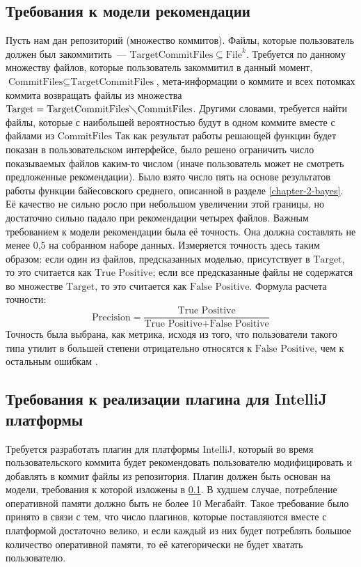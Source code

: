 \subsection{Требования к модели рекомендации}\label{ml-model-req}
Пусть нам дан репозиторий (множество коммитов). Файлы, которые пользователь должен был закоммитить~--- $\text{TargetCommitFiles} \subseteq \text{File}^k$. Требуется по данному множеству файлов, которые пользователь закоммитил в данный момент, $\text{CommitFiles} \subseteq \text{TargetCommitFiles}$, мета-информации о коммите и всех потомках коммита возвращать файлы из множества $\text{Target} = \text{TargetCommitFiles} \diagdown \text{CommitFiles}$. Другими словами, требуется найти файлы, которые с наибольшей вероятностью будут в одном коммите вместе с файлами из $\text{CommitFiles}$ Так как результат работы решающей функции будет показан в пользовательском интерфейсе, было решено ограничить число показываемых файлов каким-то числом (иначе пользователь может не смотреть предложенные рекомендации). Было взято число пять на основе результатов работы функции байесовского среднего, описанной в разделе \ref{chapter-2-bayes}. Её качество не сильно росло при небольшом увеличении этой границы, но достаточно сильно падало при рекомендации четырех файлов. Важным требованием к модели рекомендации была её точность. Она должна составлять не менее 0,5 на собранном наборе данных. Измеряется точность здесь таким образом: если один из файлов, предсказанных моделью, присутствует в $\text{Target}$, то это считается как $\text{True Positive}$; если все предсказанные файлы не содержатся во множестве $\text{Target}$, то это считается как $\text{False Positive}$. Формула расчета точности:
    \begin{equation}\label{precision-formula}
        \text{Precision} = \frac{\text{True Positive}}{\text{True Positive} + \text{False Positive}}   
    \end{equation}
Точность была выбрана, как метрика, исходя из того, что пользователи такого типа утилит в большей степени отрицательно относятся к $\text{False Positive}$, чем к остальным ошибкам \cite{microsoft-false-positive}.
\subsection{Требования к реализации плагина для IntelliJ платформы}\label{impl-req}
Требуется разработать плагин для платформы IntelliJ, который во время пользовательского коммита будет рекомендовать пользователю модифицировать и добавлять в коммит файлы из репозитория. Плагин должен быть основан на модели, требования к которой изложены в \ref{ml-model-req}. В худшем случае, потребление оперативной памяти должно быть не более 10 Мегабайт. Такое требование было принято в связи с тем, что число плагинов, которые поставляются вместе с платформой достаточно велико, и если каждый из них будет потреблять большое количество оперативной памяти, то её категорически не будет хватать пользователю.


